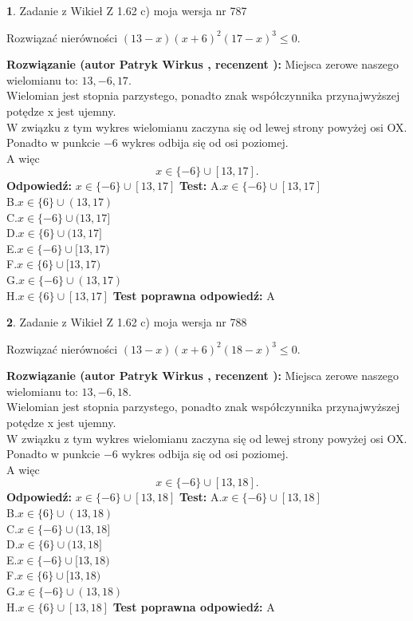 \documentclass[12pt, a4paper]{article}
\theoremstyle{definition} %
\newtheorem{zad}{}
\newcommand{\zadStart}[1]{\begin{zad}#1\newline}
\newcommand{\zadStop}{\end{zad}}
\newcommand{\rozwStart}[2]{\noindent \textbf{Rozwiązanie (autor #1 , recenzent #2): }\newline}
\newcommand{\rozwStop}{\newline}
\newcommand{\odpStart}{\noindent \textbf{Odpowiedź:}\newline}
\newcommand{\odpStop}{\newline}
\newcommand{\testStart}{\noindent \textbf{Test:}\newline}
\newcommand{\testStop}{\newline}
\newcommand{\kluczStart}{\noindent \textbf{Test poprawna odpowiedź:}\newline}
\newcommand{\kluczStop}{\newline}
\begin{document}
\zadStart{Zadanie z Wikieł Z 1.62 c) moja wersja nr 787}

Rozwiązać nierówności $(13-x)(x+6)^{2}(17-x)^{3}\le0$.
\zadStop
\rozwStart{Patryk Wirkus}{}
Miejsca zerowe naszego wielomianu to: $13, -6, 17$.\\
Wielomian jest stopnia parzystego, ponadto znak współczynnika przy\linebreak najwyższej potędze x jest ujemny.\\ W związku z tym wykres wielomianu zaczyna się od lewej strony powyżej osi OX.\\
Ponadto w punkcie $-6$ wykres odbija się od osi poziomej.\\
A więc $$x \in \{-6\} \cup [13,17].$$
\rozwStop
\odpStart
$x \in \{-6\} \cup [13,17]$
\odpStop
\testStart
A.$x \in \{-6\} \cup [13,17]$\\
B.$x \in \{6\} \cup (13,17)$\\
C.$x \in \{-6\} \cup (13,17]$\\
D.$x \in \{6\} \cup (13,17]$\\
E.$x \in \{-6\} \cup [13,17)$\\
F.$x \in \{6\} \cup [13,17)$\\
G.$x \in \{-6\} \cup (13,17)$\\
H.$x \in \{6\} \cup [13,17]$
\testStop
\kluczStart
A
\kluczStop



\zadStart{Zadanie z Wikieł Z 1.62 c) moja wersja nr 788}

Rozwiązać nierówności $(13-x)(x+6)^{2}(18-x)^{3}\le0$.
\zadStop
\rozwStart{Patryk Wirkus}{}
Miejsca zerowe naszego wielomianu to: $13, -6, 18$.\\
Wielomian jest stopnia parzystego, ponadto znak współczynnika przy\linebreak najwyższej potędze x jest ujemny.\\ W związku z tym wykres wielomianu zaczyna się od lewej strony powyżej osi OX.\\
Ponadto w punkcie $-6$ wykres odbija się od osi poziomej.\\
A więc $$x \in \{-6\} \cup [13,18].$$
\rozwStop
\odpStart
$x \in \{-6\} \cup [13,18]$
\odpStop
\testStart
A.$x \in \{-6\} \cup [13,18]$\\
B.$x \in \{6\} \cup (13,18)$\\
C.$x \in \{-6\} \cup (13,18]$\\
D.$x \in \{6\} \cup (13,18]$\\
E.$x \in \{-6\} \cup [13,18)$\\
F.$x \in \{6\} \cup [13,18)$\\
G.$x \in \{-6\} \cup (13,18)$\\
H.$x \in \{6\} \cup [13,18]$
\testStop
\kluczStart
A
\kluczStop
\end{document}
